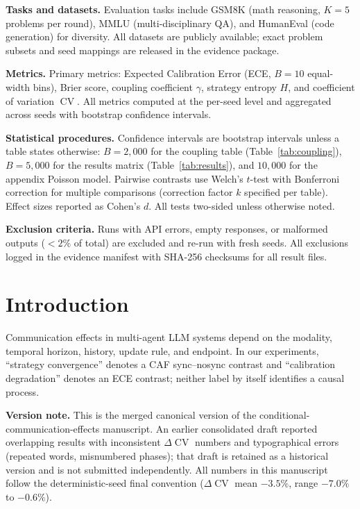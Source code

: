 \documentclass[11pt]{article}
\DeclareMathOperator{\CV}{CV}
\begin{document}
\textbf{Tasks and datasets.} Evaluation tasks include GSM8K (math reasoning, $K{=}5$ problems per round), MMLU (multi-disciplinary QA), and HumanEval (code generation) for diversity. All datasets are publicly available; exact problem subsets and seed mappings are released in the evidence package.

\textbf{Metrics.} Primary metrics: Expected Calibration Error (ECE, $B{=}10$ equal-width bins), Brier score, coupling coefficient $\gamma$, strategy entropy $H$, and coefficient of variation $\CV$. All metrics computed at the per-seed level and aggregated across seeds with bootstrap confidence intervals.

\textbf{Statistical procedures.} Confidence intervals are bootstrap intervals unless a table states otherwise: $B{=}2{,}000$ for the coupling table (Table~\ref{tab:coupling}), $B{=}5{,}000$ for the results matrix (Table~\ref{tab:results}), and $10{,}000$ for the appendix Poisson model. Pairwise contrasts use Welch's $t$-test with Bonferroni correction for multiple comparisons (correction factor $k$ specified per table). Effect sizes reported as Cohen's $d$. All tests two-sided unless otherwise noted.

\textbf{Exclusion criteria.} Runs with API errors, empty responses, or malformed outputs ($<2\%$ of total) are excluded and re-run with fresh seeds. All exclusions logged in the evidence manifest with SHA-256 checksums for all result files.

\section{Introduction}

Communication effects in multi-agent LLM systems depend on the modality, temporal horizon, history, update rule, and endpoint. In our experiments, ``strategy convergence'' denotes a CAF sync--nosync contrast and ``calibration degradation'' denotes an ECE contrast; neither label by itself identifies a causal process.

\textbf{Version note.} This is the merged canonical version of the conditional-communication-effects manuscript. An earlier consolidated draft reported overlapping results with inconsistent $\Delta\CV$ numbers and typographical errors (repeated words, misnumbered phases); that draft is retained as a historical version and is not submitted independently. All numbers in this manuscript follow the deterministic-seed final convention ($\Delta\CV$ mean $-3.5\%$, range $-7.0\%$ to $-0.6\%$).
\end{document}
